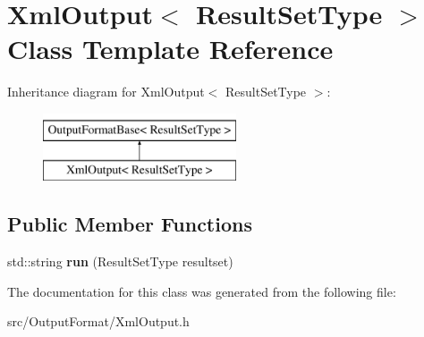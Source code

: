 \hypertarget{class_xml_output}{\section{Xml\-Output$<$ Result\-Set\-Type $>$ Class Template Reference}
\label{class_xml_output}
}
Inheritance diagram for Xml\-Output$<$ Result\-Set\-Type $>$\-:\begin{figure}[H]
\begin{center}
\leavevmode
\includegraphics[height=2.000000cm]{class_xml_output}
\end{center}
\end{figure}
\subsection*{Public Member Functions}
\begin{DoxyCompactItemize}
\item 
\hypertarget{class_xml_output_a1e645750b5266f571090d7adeaf05e99}{std\-::string {\bfseries run} (Result\-Set\-Type resultset)}\label{class_xml_output_a1e645750b5266f571090d7adeaf05e99}

\end{DoxyCompactItemize}


The documentation for this class was generated from the following file\-:\begin{DoxyCompactItemize}
\item 
src/\-Output\-Format/Xml\-Output.\-h\end{DoxyCompactItemize}
